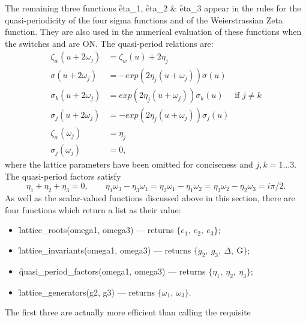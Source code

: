 \hypertarget{operator:ETA_1}{}
\hypertarget{operator:ETA_2}{}
\hypertarget{operator:ETA_3}{}
The remaining three functions \f{eta\_1}, \f{eta\_2} \& \f{eta\_3} appear in
the rules for the quasi-periodicity of the four sigma functions and of the
Weierstrassian Zeta function. They are also used in the numerical
evaluation of these functions when the switches  and 
are ON. The quasi-period relations are:
\begin{align*}
  \zeta_w(u+2\omega_j) & = \zeta_w(u)+2\eta_j\\
  \sigma(u+2\omega_j) & = -exp(2\eta_j(u+\omega_j))\sigma(u)\\
  \sigma_k(u+2\omega_j) & =  exp(2\eta_j(u+\omega_j))\sigma_k(u) \quad\text{  if  }j\neq k\\
  \sigma_j(u+2\omega_j) & = -exp(2\eta_j(u+\omega_j))\sigma_j(u)\\
  \zeta_w(\omega_j) & = \eta_j\\
  \sigma_j(\omega_j) & = 0,
\end{align*}
where the lattice parameters have been omitted for conciseness and $j,k = 1\ldots 3$.
The quasi-period factors satisfy
\[\eta_1+\eta_2+\eta_3=0,\qquad
   \eta_1\omega_3-\eta_3\omega_1=\eta_2\omega_1-\eta_1\omega_2=\eta_3\omega_2-\eta_2\omega_3=i\pi/2.\]
As well as the scalar-valued functions discussed above in this section,
there are four functions which return a list as their value:
\hypertarget{operator:LATTICE_ROOTS}{}
\hypertarget{operator:LATTICE_INVARIANTS}{}
\hypertarget{operator:LATTICE_GENERATORS}{}
\hypertarget{operator:QUASI_PERIOD_FACTORS}{}
\begin{itemize}
\item \f{lattice\_roots(omega1, omega3)} --- returns $\{e_1,\ e_2,\ e_3\}$;
\item \f{lattice\_invariants(omega1, omega3)} --- returns
  $\{g_2,\ g_3,\ \Delta,\ \mathrm{G}\}$;
\item \f{quasi\_period\_factors(omega1, omega3)}
  --- returns $\{\eta_1,\ \eta_2,\ \eta_3\}$;
\item \f{lattice\_generators(g2, g3)}  --- returns $\{\omega_1,\ \omega_3\}$.
\end{itemize}
The first three are actually more efficient than calling the requisite
